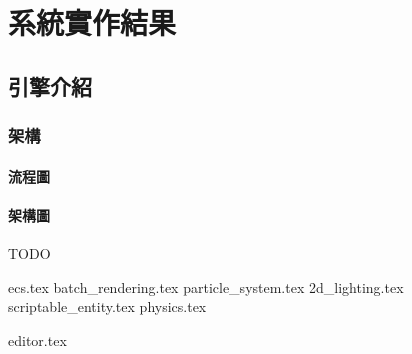 \chapter{系統實作結果}

\section{引擎介紹}

\subsection{架構}
\label{sub:架構}

\subsubsection{流程圖} %
\label{ssub:流程圖}



\subsubsection{架構圖} %
\label{ssub:架構圖}
TODO


{ecs.tex}
{batch_rendering.tex}
{particle_system.tex}
{2d_lighting.tex}
{scriptable_entity.tex}
{physics.tex}

{editor.tex}

\newpage